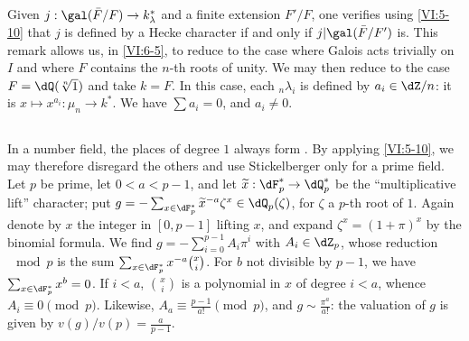 \subsection{}\label{VI:6-6}

Given $j:\gal(\bar F/F) \to k_\lambda^\ast$ and a finite extension 
$F'/F$, one verifies using \ref{VI:5-10} that $j$ is defined by a 
Hecke character if and only if $j|\gal(\bar F/F')$ is. This 
remark allows us, in \ref{VI:6-5}, to reduce to the case where Galois acts 
trivially on $I$ and where $F$ contains the $n$-th roots of 
unity. We may then reduce to the case $F=\dQ(\sqrt[n]{1})$ and 
take $k=F$. In this case, each $_n \lambda_i$ is defined by 
$a_i\in \dZ/n$: it is $x\mapsto x^{a_i}:\mu_n \to k^\ast$. We have 
$\sum a_i=0$, and $a_i\ne 0$. 





\subsection{}\label{VI:6-7}

In a number field, the places of degree $1$ always form . By applying \ref{VI:5-10}, we may therefore disregard 
the others and use Stickelberger only for a prime field. Let 
$p$ be prime, let $0<a<p-1$, and let $\widetilde x:\dF_p^\ast \to \dQ_p^\ast$ be the 
``multiplicative lift'' character; put 
  $g=-\sum_{x\in \dF_p^\ast} \widetilde x^{-a} \zeta^x\in \dQ_p(\zeta)$, for 
$\zeta$ a $p$-th root of $1$. Again denote by $x$ the integer in $[0,p-1]$ 
  lifting $x$, and expand $\zeta^x=(1+\pi)^x$ by the binomial formula. 
  We find $g=-\sum_{i=0}^{p-1} A_i\pi^i$ with $A_i\in \dZ_p$, whose reduction 
$\mod p$ is the sum $\sum_{x\in \dF_p^\ast} x^{-a} \binom x i$. For $b$ not 
divisible by $p-1$, we have $\sum_{x\in \dF_p^\ast} x^b=0$. If $i<a$, 
$\binom x i$ is a polynomial in $x$ of degree $i<a$, whence 
$A_i\equiv 0\pmod p$. Likewise, $A_a\equiv \frac{p-1}{a!} \pmod p$, and 
$g\sim \frac{\pi^a}{a!}$: the valuation of $g$ is given by 
$v(g)/v(p) = \frac{a}{p-1}$. 





\subsection{}\label{VI:6-8}

